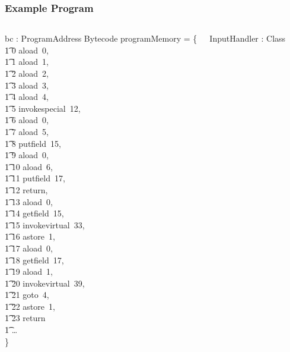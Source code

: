 \documentclass{beamer}
\begin{document}
\begin{frame}
  \frametitle{Example Program}
  \tiny
  \setlength{\zedleftsep}{0cm}
  \setlength{\zedindent}{0cm}
  \setlength{\zedtab}{0.3cm}
  \setlength{\abovedisplayskip}{0cm}
  \setlength{\abovedisplayshortskip}{0cm}
  \setlength{\belowdisplayskip}{0cm}
  \setlength{\belowdisplayshortskip}{0cm}
  \begin{columns}[T]
    \begin{axdef}
      bc : ProgramAddress \pfun Bytecode
    \where
      programMemory = \{ \\
      \t1 0 \mapsto aload~0, \\
      \t1 1 \mapsto aload~1, \\
      \t1 2 \mapsto aload~2, \\
      \t1 3 \mapsto aload~3, \\
      \t1 4 \mapsto aload~4, \\
      \t1 5 \mapsto invokespecial~12, \\
      \t1 6 \mapsto aload~0, \\
      \t1 7 \mapsto aload~5, \\
      \t1 8 \mapsto putfield~15, \\
      \t1 9 \mapsto aload~0, \\
      \t1 10 \mapsto aload~6, \\
      \t1 11 \mapsto putfield~17, \\
      \t1 12 \mapsto return, \\
      \t1 13 \mapsto aload~0, \\
      \t1 14 \mapsto getfield~15, \\
      \t1 15 \mapsto invokevirtual~33, \\
      \t1 16 \mapsto astore~1, \\
      \t1 17 \mapsto aload~0, \\
      \t1 18 \mapsto getfield~17, \\
      \t1 19 \mapsto aload~1, \\
      \t1 20 \mapsto invokevirtual~39, \\
      \t1 21 \mapsto goto~4, \\
      \t1 22 \mapsto astore~1, \\
      \t1 23 \mapsto return \\
      \t1 \dots \\
      \} 
    \end{axdef}
    \begin{axdef}
      InputHandler : Class

\end{axdef}
\end{columns}
\end{frame}
\end{document}
